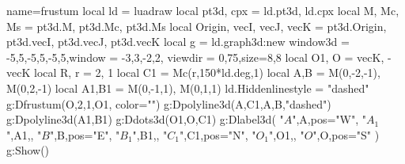 \documentclass{standalone}
\begin{document}
    \begin{luadraw}{name=frustum}
    local ld = luadraw
    local pt3d, cpx = ld.pt3d, ld.cpx
    local M, Mc, Ms = pt3d.M, pt3d.Mc, pt3d.Ms
    local Origin, vecI, vecJ, vecK = pt3d.Origin, pt3d.vecI, pt3d.vecJ, pt3d.vecK
    local g = ld.graph3d:new{
        window3d = {-5,5,-5,5,-5,5},window = {-3,3,-2,2},
        viewdir = {0,75},size={8,8}
    }
    local O1, O = vecK, -vecK
    local R, r = 2, 1
    local C1 = Mc(r,150*ld.deg,1)
    local A,B = M(0,-2,-1), M(0,2,-1)
    local A1,B1 = M(0,-1,1), M(0,1,1)
    ld.Hiddenlinestyle = "dashed"
    g:Dfrustum(O,2,1,O1, {color=""})
    g:Dpolyline3d({{A,C1},{A,B}},"dashed")
    g:Dpolyline3d({A1,B1})
    g:Ddots3d({O1,O,C1})
    g:Dlabel3d(
        "$A$",A,{pos="W"},
        "$A_1$",A1,{},
        "$B$",B,{pos="E"},
        "$B_1$",B1,{},
        "$C_1$",C1,{pos="N"},
        "$O_1$",O1,{},
        "$O$",O,{pos="S"}
    )
    g:Show()
\end{luadraw}
\end{document}
